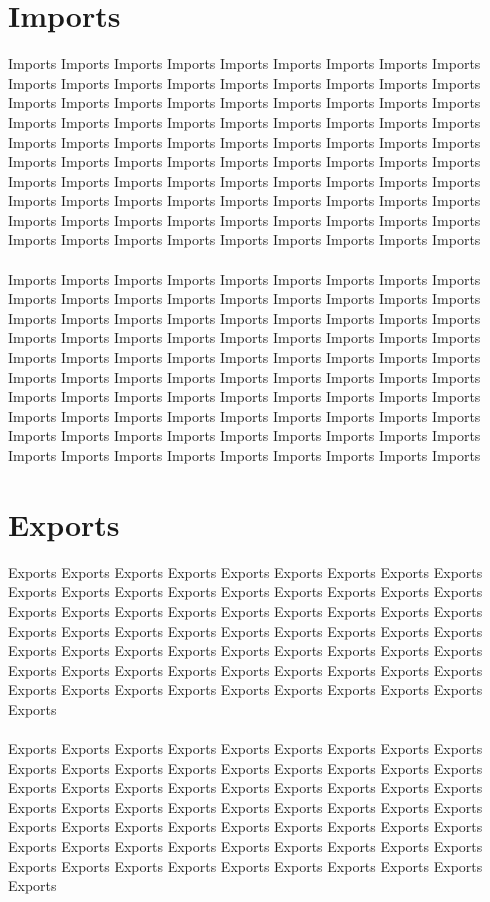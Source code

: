\documentclass[paper=a4, fontsize=10pt]{scrartcl} %
\begin{document}
\section{Imports}
{Imports Imports  Imports Imports Imports Imports Imports Imports Imports Imports Imports Imports Imports Imports Imports Imports Imports Imports Imports Imports Imports Imports Imports Imports Imports Imports Imports Imports Imports Imports Imports Imports Imports Imports Imports Imports Imports Imports Imports Imports Imports Imports Imports Imports Imports Imports Imports Imports Imports Imports Imports Imports Imports Imports Imports Imports Imports Imports Imports Imports Imports Imports Imports Imports Imports Imports Imports Imports Imports Imports Imports Imports Imports Imports Imports Imports Imports Imports Imports Imports Imports Imports Imports Imports Imports Imports Imports Imports Imports Imports \\\\
Imports Imports  Imports Imports Imports Imports Imports Imports Imports Imports Imports Imports Imports Imports Imports Imports Imports Imports Imports Imports Imports Imports Imports Imports Imports Imports Imports Imports Imports Imports Imports Imports Imports Imports Imports Imports Imports Imports Imports Imports Imports Imports Imports Imports Imports Imports Imports Imports Imports Imports Imports Imports Imports Imports Imports Imports Imports Imports Imports Imports Imports Imports Imports Imports Imports Imports Imports Imports Imports Imports Imports Imports Imports Imports Imports Imports Imports Imports Imports Imports Imports Imports Imports Imports Imports Imports Imports Imports Imports Imports 
}
\section{Exports}
{Exports Exports Exports Exports Exports Exports Exports Exports Exports Exports Exports Exports Exports Exports Exports Exports Exports Exports Exports Exports Exports Exports Exports Exports Exports Exports Exports Exports Exports Exports Exports Exports Exports Exports Exports Exports Exports Exports Exports Exports Exports Exports Exports Exports Exports Exports Exports Exports Exports Exports Exports Exports Exports Exports Exports Exports Exports Exports Exports Exports Exports Exports Exports Exports \\\\
Exports Exports Exports Exports Exports Exports Exports Exports Exports Exports Exports Exports Exports Exports Exports Exports Exports Exports Exports Exports Exports Exports Exports Exports Exports Exports Exports Exports Exports Exports Exports Exports Exports Exports Exports Exports Exports Exports Exports Exports Exports Exports Exports Exports Exports Exports Exports Exports Exports Exports Exports Exports Exports Exports Exports Exports Exports Exports Exports Exports Exports Exports Exports Exports }
\end{document}
